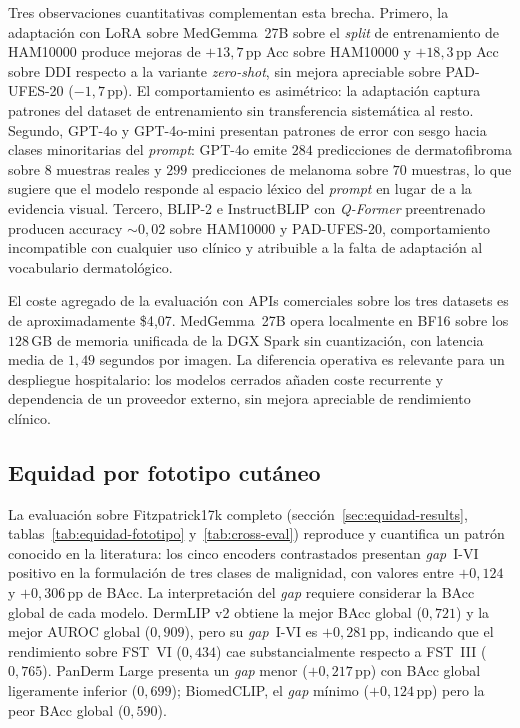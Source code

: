 Tres observaciones cuantitativas complementan esta brecha. Primero,
la adaptación con LoRA sobre MedGemma~27B sobre el \emph{split} de
entrenamiento de HAM10000 produce mejoras de $+13{,}7$\,pp Acc
sobre HAM10000 y $+18{,}3$\,pp Acc sobre DDI respecto a la
variante \emph{zero-shot}, sin mejora apreciable sobre
PAD-UFES-20 ($-1{,}7$\,pp). El comportamiento es asimétrico: la
adaptación captura patrones del dataset de entrenamiento sin
transferencia sistemática al resto. Segundo, GPT-4o y
GPT-4o-mini presentan patrones de error con sesgo hacia clases
minoritarias del \emph{prompt}: GPT-4o emite $284$
predicciones de dermatofibroma sobre $8$ muestras reales y
$299$ predicciones de melanoma sobre $70$ muestras, lo que
sugiere que el modelo responde al espacio léxico del \emph{prompt}
en lugar de a la evidencia visual. Tercero, BLIP-2 e InstructBLIP
con \emph{Q-Former} preentrenado producen accuracy
$\sim 0{,}02$ sobre HAM10000 y PAD-UFES-20, comportamiento
incompatible con cualquier uso clínico y atribuible a la falta de
adaptación al vocabulario dermatológico.

El coste agregado de la evaluación con APIs comerciales sobre los
tres datasets es de aproximadamente \$4{,}07. MedGemma~27B
opera localmente en BF16 sobre los $128$\,GB de memoria
unificada de la DGX Spark sin cuantización, con latencia media de
$1{,}49$ segundos por imagen. La diferencia operativa es
relevante para un despliegue hospitalario: los modelos cerrados
añaden coste recurrente y dependencia de un proveedor externo, sin
mejora apreciable de rendimiento clínico.

\subsection{Equidad por fototipo cutáneo}
\label{sec:disc-equidad}

La evaluación sobre Fitzpatrick17k completo
(secci\'on~\ref{sec:equidad-results}, tablas~\ref{tab:equidad-fototipo}
y~\ref{tab:cross-eval}) reproduce y cuantifica un patrón conocido
en la literatura: los cinco encoders contrastados presentan
\emph{gap}~I-VI positivo en la formulación de tres clases de
malignidad, con valores entre $+0{,}124$ y $+0{,}306$\,pp de
BAcc. La interpretación del \emph{gap} requiere considerar la
BAcc global de cada modelo. DermLIP v2 obtiene la mejor BAcc
global ($0{,}721$) y la mejor AUROC global ($0{,}909$), pero
su \emph{gap}~I-VI es $+0{,}281$\,pp, indicando que el
rendimiento sobre FST~VI ($0{,}434$) cae substancialmente
respecto a FST~III ($0{,}765$). PanDerm Large presenta un
\emph{gap} menor ($+0{,}217$\,pp) con BAcc global ligeramente
inferior ($0{,}699$); BiomedCLIP, el \emph{gap} mínimo
($+0{,}124$\,pp) pero la peor BAcc global ($0{,}590$).

